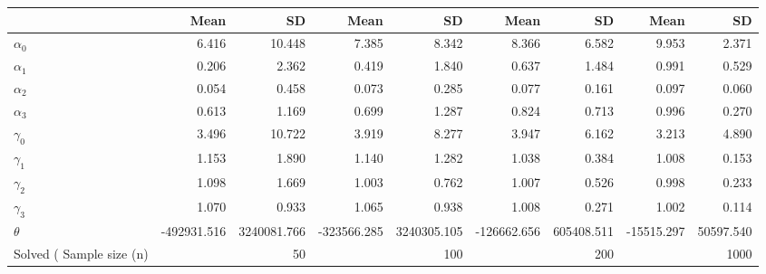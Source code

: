 
\begin{tabular}[t]{lrrrrrrrr}
\toprule
  & Mean & SD & Mean  & SD  & Mean   & SD   & Mean    & SD   \\
\midrule
$\alpha_{0}$ & 6.416 & 10.448 & 7.385 & 8.342 & 8.366 & 6.582 & 9.953 & 2.371\\
$\alpha_{1}$ & 0.206 & 2.362 & 0.419 & 1.840 & 0.637 & 1.484 & 0.991 & 0.529\\
$\alpha_{2}$ & 0.054 & 0.458 & 0.073 & 0.285 & 0.077 & 0.161 & 0.097 & 0.060\\
$\alpha_{3}$ & 0.613 & 1.169 & 0.699 & 1.287 & 0.824 & 0.713 & 0.996 & 0.270\\
$\gamma_{0}$ & 3.496 & 10.722 & 3.919 & 8.277 & 3.947 & 6.162 & 3.213 & 4.890\\
$\gamma_{1}$ & 1.153 & 1.890 & 1.140 & 1.282 & 1.038 & 0.384 & 1.008 & 0.153\\
$\gamma_{2}$ & 1.098 & 1.669 & 1.003 & 0.762 & 1.007 & 0.526 & 0.998 & 0.233\\
$\gamma_{3}$ & 1.070 & 0.933 & 1.065 & 0.938 & 1.008 & 0.271 & 1.002 & 0.114\\
$\theta$ & -492931.516 & 3240081.766 & -323566.285 & 3240305.105 & -126662.656 & 605408.511 & -15515.297 & 50597.540\\
Solved (%
Sample size (n) &  & 50 &  & 100 &  & 200 &  & 1000\\
\bottomrule
\end{tabular}
